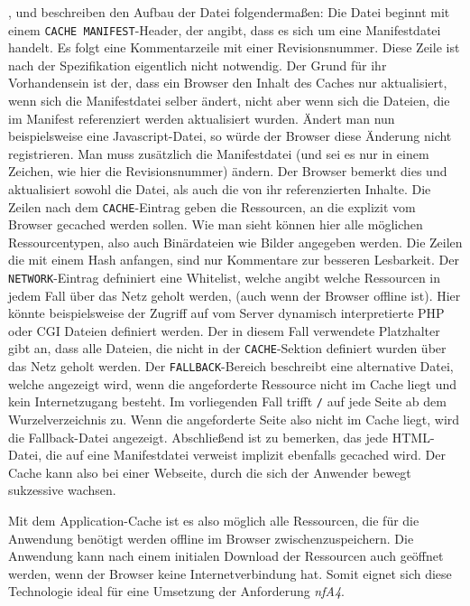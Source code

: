 \cite{W3C2012}, \cite{html5upandrunningchapter8} und \cite{Bidelman2010} beschreiben den Aufbau der Datei folgendermaßen: Die Datei beginnt mit einem \texttt{CACHE MANIFEST}-Header, der angibt, dass es sich um eine Manifestdatei handelt. Es folgt eine Kommentarzeile mit einer Revisionsnummer. Diese Zeile ist nach der Spezifikation eigentlich nicht notwendig. Der Grund für ihr Vorhandensein ist der, dass ein Browser den Inhalt des Caches nur aktualisiert, wenn sich die Manifestdatei selber ändert, nicht aber wenn sich die Dateien, die im Manifest referenziert werden aktualisiert wurden. Ändert man nun beispielsweise eine Javascript-Datei, so würde der Browser diese Änderung nicht registrieren. Man muss zusätzlich die Manifestdatei (und sei es nur in einem Zeichen, wie hier die Revisionsnummer) ändern. Der Browser bemerkt dies und aktualisiert sowohl die Datei, als auch die von ihr referenzierten Inhalte. Die Zeilen nach dem \texttt{CACHE}-Eintrag geben die Ressourcen, an die explizit vom Browser gecached werden sollen. Wie man sieht können hier alle möglichen Ressourcentypen, also auch Binärdateien wie Bilder angegeben werden. Die Zeilen die mit einem Hash anfangen, sind nur Kommentare zur besseren Lesbarkeit. Der \texttt{NETWORK}-Eintrag defniniert eine Whitelist, welche angibt welche Ressourcen in jedem Fall über das Netz geholt werden, (auch wenn der Browser offline ist). Hier könnte beispielsweise der Zugriff auf vom Server dynamisch interpretierte PHP oder CGI Dateien definiert werden. Der in diesem Fall verwendete Platzhalter gibt an, dass alle Dateien, die nicht in der \texttt{CACHE}-Sektion definiert wurden über das Netz geholt werden. Der \texttt{FALLBACK}-Bereich beschreibt eine alternative Datei, welche angezeigt wird, wenn die angeforderte Ressource nicht im Cache liegt und kein Internetzugang besteht. Im vorliegenden Fall trifft \texttt{/} auf jede Seite ab dem Wurzelverzeichnis zu. Wenn die angeforderte Seite also nicht im Cache liegt, wird die Fallback-Datei angezeigt. Abschließend ist zu bemerken, das jede HTML-Datei, die auf eine Manifestdatei verweist implizit ebenfalls gecached wird. Der Cache kann also bei einer Webseite, durch die sich der Anwender bewegt sukzessive wachsen.

Mit dem Application-Cache ist es also möglich alle Ressourcen, die für die Anwendung benötigt werden offline im Browser zwischenzuspeichern. Die Anwendung kann nach einem initialen Download der Ressourcen auch geöffnet werden, wenn der Browser keine Internetverbindung hat. Somit eignet sich diese Technologie ideal für eine Umsetzung der Anforderung \emph{nfA4}.

